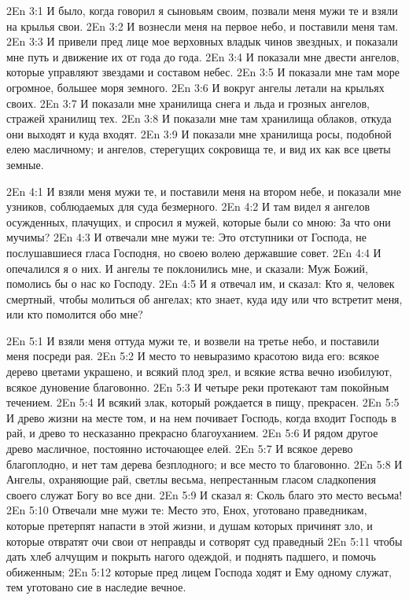 \vs 2En 3:1
И было, когда говорил я сыновьям своим, позвали меня мужи те и взяли на крылья свои.
\vs 2En 3:2
И вознесли меня на первое небо, и поставили меня там.
\vs 2En 3:3
И привели пред лице мое верховных владык чинов звездных, и показали мне путь и движение их от года до года.
\vs 2En 3:4
И показали мне двести ангелов, которые управляют звездами и составом небес.
\vs 2En 3:5
И показали мне там море огромное, большее моря земного.
\vs 2En 3:6
И вокруг ангелы летали на крыльях своих.
\vs 2En 3:7
И показали мне хранилища снега и льда и грозных ангелов, стражей хранилищ тех.
\vs 2En 3:8
И показали мне там хранилища облаков, откуда они выходят и куда входят.
\vs 2En 3:9
И показали мне хранилища росы, подобной елею масличному; и ангелов, стерегущих сокровища те, и вид их как все цветы земные.

\vs 2En 4:1
И взяли меня мужи те, и поставили меня на втором небе, и показали мне узников, соблюдаемых для суда безмерного.
\vs 2En 4:2
И там видел я ангелов осужденных, плачущих, и спросил я мужей, которые были со мною: За что они мучимы?
\vs 2En 4:3
И отвечали мне мужи те: Это отступники от Господа, не послушавшиеся гласа Господня, но своею волею державшие совет.
\vs 2En 4:4
И опечалился я о них. И ангелы те поклонились мне, и сказали: Муж Божий, помолись бы о нас ко Господу.
\vs 2En 4:5
И я отвечал им, и сказал: Кто я, человек смертный, чтобы молиться об ангелах; кто знает, куда иду или что встретит меня, или кто помолится обо мне?

\vs 2En 5:1
И взяли меня оттуда мужи те, и возвели на третье небо, и поставили меня посреди рая.
\vs 2En 5:2
И место то невыразимо красотою вида его: всякое дерево цветами украшено, и всякий плод зрел, и всякие яства вечно изобилуют, всякое дуновение благовонно.
\vs 2En 5:3
И четыре реки протекают там покойным течением.
\vs 2En 5:4
И всякий злак, который рождается в пищу, прекрасен.
\vs 2En 5:5
И древо жизни на месте том, и на нем почивает Господь, когда входит Господь в рай, и древо то несказанно прекрасно благоуханием.
\vs 2En 5:6
И рядом другое древо масличное, постоянно источающее елей.
\vs 2En 5:7
И всякое дерево благоплодно, и нет там дерева безплодного; и все место то благовонно.
\vs 2En 5:8
И Ангелы, охраняющие рай, светлы весьма, непрестанным гласом сладкопения своего служат Богу во все дни.
\vs 2En 5:9
И сказал я: Сколь благо это место весьма!
\vs 2En 5:10
Отвечали мне мужи те: Место это, Енох, уготовано праведникам, которые претерпят напасти в этой жизни, и душам которых причинят зло, и которые отвратят очи свои от неправды и сотворят суд праведный
\vs 2En 5:11
чтобы дать хлеб алчущим и покрыть нагого одеждой, и поднять падшего, и помочь обиженным;
\vs 2En 5:12
которые пред лицем Господа ходят и Ему одному служат, тем уготовано сие в наследие вечное.

